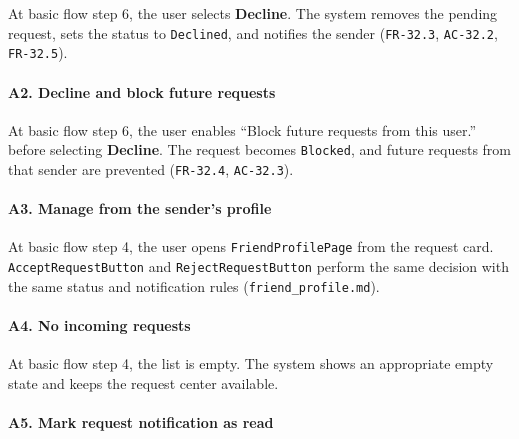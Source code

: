 \documentclass[12pt]{article}
\begin{document}
At basic flow step 6, the user selects \textbf{Decline}. The system removes the pending request, sets the status to \texttt{Declined}, and notifies the sender (\texttt{FR-32.3}, \texttt{AC-32.2}, \texttt{FR-32.5}).
\par\medskip

\hypertarget{sec:a2-decline-and-block-future-requests}{}
\paragraph*{A2. Decline and block future requests}
\par\medskip

At basic flow step 6, the user enables “Block future requests from this user.” before selecting \textbf{Decline}. The request becomes \texttt{Blocked}, and future requests from that sender are prevented (\texttt{FR-32.4}, \texttt{AC-32.3}).
\par\medskip

\hypertarget{sec:a3-manage-from-the-sender-s-profile}{}
\paragraph*{A3. Manage from the sender's profile}
\par\medskip

At basic flow step 4, the user opens \texttt{FriendProfilePage} from the request card. \texttt{AcceptRequestButton} and \texttt{RejectRequestButton} perform the same decision with the same status and notification rules (\texttt{friend\_profile.md}).
\par\medskip

\hypertarget{sec:a4-no-incoming-requests}{}
\paragraph*{A4. No incoming requests}
\par\medskip

At basic flow step 4, the list is empty. The system shows an appropriate empty state and keeps the request center available.
\par\medskip

\hypertarget{sec:a5-mark-request-notification-as-read}{}
\paragraph*{A5. Mark request notification as read}
\par\medskip
\end{document}
